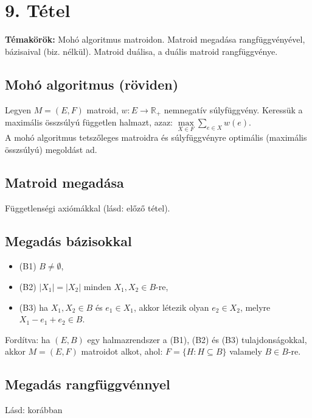 
\setcounter{chapter}{9}
\chapter*{9. Tétel}

\textbf{Témakörök:} Mohó algoritmus matroidon. Matroid megadása rangfüggvényével, bázisaival (biz. nélkül). Matroid duálisa, a duális matroid rangfüggvénye.

\noindent\hrulefill

\section*{Mohó algoritmus (röviden)}

Legyen $M=(E,F)$ matroid, $w:E\rightarrow \mathbb{R}_{+}$ nemnegatív súlyfüggvény. Keressük a maximális összsúlyú független halmazt, azaz: $\max\limits_{X\in F} \sum\limits_{e\in X} w(e)$.\\
A mohó algoritmus tetszőleges matroidra és súlyfüggvényre optimális (maximális összsúlyú) megoldást ad.

\section*{Matroid megadása}

Függetlenségi axiómákkal (lásd: előző tétel).

\section*{Megadás bázisokkal}
\begin{itemize}
\item (B1) $B\neq\emptyset$,
\item (B2) $|X_{1}| = |X_{2}|$ minden $X_{1},X_{2}\in B$-re,
\item (B3) ha $X_{1},X_{2}\in B$ és $e_{1}\in X_{1}$, akkor létezik olyan $e_{2}\in X_{2}$, melyre $X_{1}-e_{1}+e_{2}\in B$.
\end{itemize}
Fordítva: ha $(E,B)$ egy halmazrendszer a (B1), (B2) és (B3) tulajdonságokkal, akkor $M=(E,F)$ matroidot alkot, ahol: $F=\lbrace H:H\subseteq B\rbrace$ valamely $B\in B$-re.

\section*{Megadás rangfüggvénnyel}
Lásd: korábban

